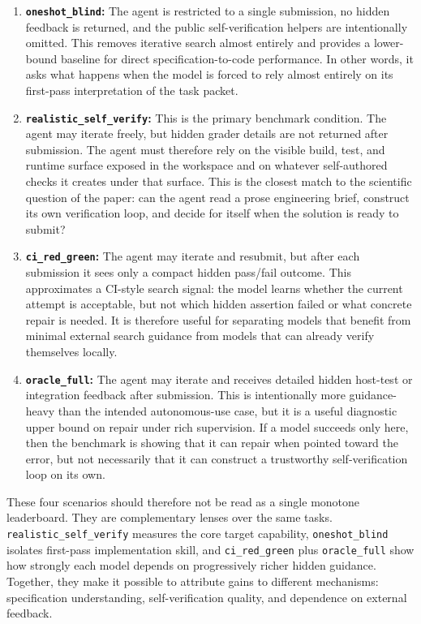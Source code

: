 \documentclass[a4paper,fleqn]{cas-dc}
\DeclareRobustCommand{\tool}[1]{\texttt{\nolinkurl{#1}}}
\begin{document}
\begin{enumerate}
    \item \textbf{\tool{oneshot_blind}:} The agent is restricted to a single submission, no hidden feedback is returned, and the public self-verification helpers are intentionally omitted. This removes iterative search almost entirely and provides a lower-bound baseline for direct specification-to-code performance. In other words, it asks what happens when the model is forced to rely almost entirely on its first-pass interpretation of the task packet.
    
    \item \textbf{\tool{realistic_self_verify}:} This is the primary benchmark condition. The agent may iterate freely, but hidden grader details are not returned after submission. The agent must therefore rely on the visible build, test, and runtime surface exposed in the workspace and on whatever self-authored checks it creates under that surface. This is the closest match to the scientific question of the paper: can the agent read a prose engineering brief, construct its own verification loop, and decide for itself when the solution is ready to submit?

    \item \textbf{\tool{ci_red_green}:} The agent may iterate and resubmit, but after each submission it sees only a compact hidden pass/fail outcome. This approximates a CI-style search signal: the model learns whether the current attempt is acceptable, but not which hidden assertion failed or what concrete repair is needed. It is therefore useful for separating models that benefit from minimal external search guidance from models that can already verify themselves locally.

    \item \textbf{\tool{oracle_full}:} The agent may iterate and receives detailed hidden host-test or integration feedback after submission. This is intentionally more guidance-heavy than the intended autonomous-use case, but it is a useful diagnostic upper bound on repair under rich supervision. If a model succeeds only here, then the benchmark is showing that it can repair when pointed toward the error, but not necessarily that it can construct a trustworthy self-verification loop on its own.
\end{enumerate}

These four scenarios should therefore not be read as a single monotone leaderboard. They are complementary lenses over the same tasks. \tool{realistic_self_verify} measures the core target capability, \tool{oneshot_blind} isolates first-pass implementation skill, and \tool{ci_red_green} plus \tool{oracle_full} show how strongly each model depends on progressively richer hidden guidance. Together, they make it possible to attribute gains to different mechanisms: specification understanding, self-verification quality, and dependence on external feedback.
\end{document}
